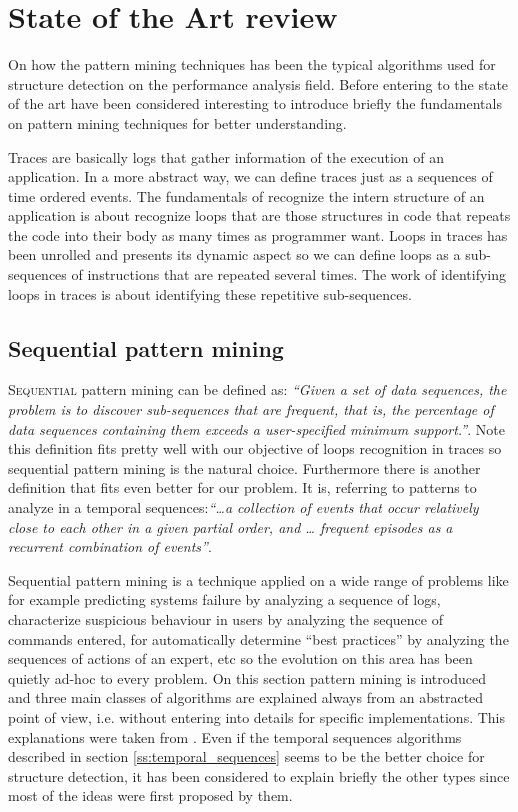 \chapter{State of the Art review}

On how the pattern mining techniques has been the typical algorithms used for
structure detection on the performance analysis field. Before entering to the 
state of the art have been considered interesting to introduce briefly the 
fundamentals on pattern mining techniques for better understanding.

Traces are basically logs that gather information of the execution of an
application. In a more abstract way, we can define traces just as a sequences
of time ordered events. The fundamentals of recognize the intern structure of an
application is about recognize loops that are those structures in code that
repeats the code into their body as many times as programmer want. Loops in
traces has been unrolled and presents its dynamic aspect so we can define loops
as a sub-sequences of instructions that are repeated several times. The work of
identifying loops in traces is about identifying these repetitive sub-sequences.

\section{Sequential pattern mining}\label{pattern_mining}

\lettrine{S}{equential} pattern mining can be defined as: \textit{``Given a set of data sequences, the
problem is to discover sub-sequences that are frequent, that is, the percentage of
data sequences containing them exceeds a user-specified minimum support.''}. Note 
this definition fits pretty well with our objective of loops recognition in traces 
so sequential pattern mining is the natural choice. Furthermore there is another
definition that fits even better for our problem. It is, referring to patterns to
analyze in a temporal sequences:\textit{``\ldots a collection of events that
occur relatively close to each other in a given partial order, and \ldots
frequent episodes as a recurrent combination of events''}.

Sequential pattern mining is a technique applied on a wide range of problems
like for example predicting systems failure by analyzing a sequence of logs,
characterize suspicious behaviour in users by analyzing the sequence of commands
entered, for automatically determine “best practices” by analyzing the sequences
of actions of an expert, etc so the evolution on this area has been quietly
ad-hoc to every problem. On this section pattern mining is introduced and three
main classes of algorithms are explained always from an abstracted point of
view, i.e. without entering into details for specific implementations. This
explanations were taken from \cite{mooney2013sequential}. Even if the temporal
sequences algorithms described in section \ref{ss:temporal_sequences} seems to
be the better choice for structure detection, it has been considered to explain
briefly the other types since most of the ideas were first proposed by them.

